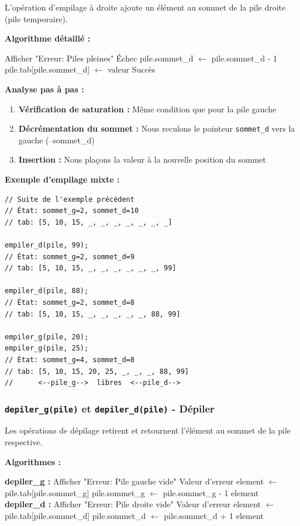 \documentclass[a4paper, 11pt]{article}
\begin{document}
L'opération d'empilage à droite ajoute un élément au sommet de la pile droite (pile temporaire).

\textbf{Algorithme détaillé :}
\begin{algorithmic}
    \State Afficher "Erreur: Piles pleines"
    \State \Return Échec
\Else
    \State pile.sommet\_d $\leftarrow$ pile.sommet\_d - 1
    \State pile.tab[pile.sommet\_d] $\leftarrow$ valeur
    \State \Return Succès
\EndIf
\end{algorithmic}

\textbf{Analyse pas à pas :}
\begin{enumerate}
    \item \textbf{Vérification de saturation :} Même condition que pour la pile gauche
    \item \textbf{Décrémentation du sommet :} Nous reculons le pointeur \texttt{sommet\_d} vers la gauche (--sommet\_d)
    \item \textbf{Insertion :} Nous plaçons la valeur à la nouvelle position du sommet
\end{enumerate}

\textbf{Exemple d'empilage mixte :}
\begin{lstlisting}
// Suite de l'exemple précédent
// État: sommet_g=2, sommet_d=10
// tab: [5, 10, 15, _, _, _, _, _, _, _]

empiler_d(pile, 99);
// État: sommet_g=2, sommet_d=9
// tab: [5, 10, 15, _, _, _, _, _, _, 99]

empiler_d(pile, 88);
// État: sommet_g=2, sommet_d=8
// tab: [5, 10, 15, _, _, _, _, _, 88, 99]

empiler_g(pile, 20);
empiler_g(pile, 25);
// État: sommet_g=4, sommet_d=8
// tab: [5, 10, 15, 20, 25, _, _, _, 88, 99]
//      <--pile_g-->  libres  <--pile_d-->
\end{lstlisting}

\subsubsection*{\texttt{depiler\_g(pile)} et \texttt{depiler\_d(pile)} - Dépiler}

Les opérations de dépilage retirent et retournent l'élément au sommet de la pile respective.

\textbf{Algorithmes :}
\begin{algorithmic}
\State \textbf{depiler\_g :}
    \State Afficher "Erreur: Pile gauche vide"
    \State \Return Valeur d'erreur
\Else
    \State element $\leftarrow$ pile.tab[pile.sommet\_g]
    \State pile.sommet\_g $\leftarrow$ pile.sommet\_g - 1
    \State \Return element
\EndIf
\State
\State \textbf{depiler\_d :}
    \State Afficher "Erreur: Pile droite vide"
    \State \Return Valeur d'erreur
\Else
    \State element $\leftarrow$ pile.tab[pile.sommet\_d]
    \State pile.sommet\_d $\leftarrow$ pile.sommet\_d + 1
    \State \Return element
\EndIf
\end{algorithmic}
\end{document}
